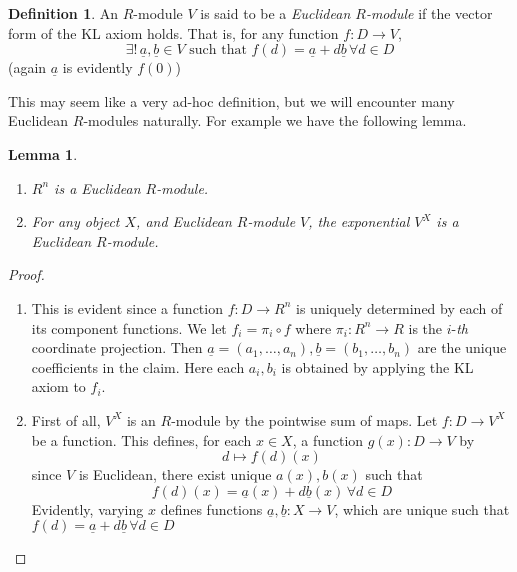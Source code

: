 \documentclass[11pt]{article}
\newtheorem{lemma}{Lemma}[section]
\theoremstyle{definition}
\newtheorem{defn}{Definition}[section]
\renewcommand{\vec}{\underline} %
\numberwithin{equation}{section}
\begin{document}
\begin{defn}
  An \( R \)-module \( V \) is said to be a \emph{Euclidean \( R \)-module} if the vector form of the KL axiom holds. That is, for any function \( f: D\to V \),
  \begin{equation*}
    \exists! \, \vec a,\vec b\in V \text{ such that } f(d) = \vec a + d\vec b \,\forall d\in D
  \end{equation*}
  (again \( \vec a \) is evidently \( f(0) \))
\end{defn}

This may seem like a very ad-hoc definition, but we will encounter many Euclidean \( R \)-modules naturally. For example we have the following lemma.

\begin{lemma}
  \leavevmode
  \begin{enumerate}
    \item \( R^n \) is a Euclidean \( R \)-module.
    \item For any object \( X \), and Euclidean \( R \)-module \( V \), the exponential \( V^X \) is a Euclidean \( R \)-module. 
  \end{enumerate}
  \label{lm:Emod}
\end{lemma}

\begin{proof}
  \leavevmode
  \begin{enumerate}
    \item This is evident since a function \( f:D\to R^n \) is uniquely determined by each of its component functions. We let \( f_i = \pi_i \circ{f}  \) where \( \pi_i:R^n\to R \) is the \( i \)-\textit{th} coordinate projection. Then \( \vec a=(a_1,\dots,a_n), \vec b=(b_1,\dots,b_n) \) are the unique coefficients in the claim. Here each \( a_i,b_i \) is obtained by applying the KL axiom to \( f_i \).
    \item First of all, \( V^X \) is an \( R \)-module by the pointwise sum of maps. Let \( f:D\to V^X \) be a function. This defines, for each \( x\in X \), a function \( g(x):D\to V \) by
    \begin{equation*}
      d\mapsto f(d)(x)
    \end{equation*}
    since \( V \) is Euclidean, there exist unique \( a(x), b(x) \) such that
    \begin{equation*}
      f(d)(x) = \vec a(x) + d\vec b(x)\,\forall d\in D
    \end{equation*}
    Evidently, varying \( x \) defines functions \( \vec a,\vec b:X\to V \), which are unique such that \( f(d) = \vec a + d\vec b \,\forall d\in D\)
  \end{enumerate}
\end{proof}
\end{document}
